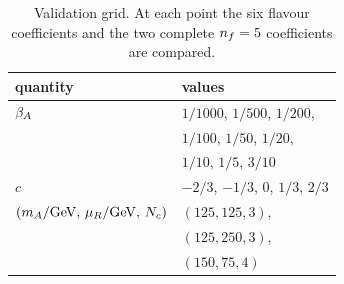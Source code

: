 \begin{table}[t]
\centering


\begin{tabular}{ll}
\toprule
quantity & values \\
\midrule
$\beta_A$ & $1/1000$, $1/500$, $1/200$, \\
 & $1/100$, $1/50$, $1/20$, \\
 & $1/10$, $1/5$, $3/10$ \\
$c$ & $-2/3$, $-1/3$, $0$, $1/3$, $2/3$ \\
$(m_A/\mathrm{GeV},\,\mu_R/\mathrm{GeV},\,N_c)$ & $(125,125,3)$, \\
 & $(125,250,3)$, \\
 & $(150,75,4)$ \\
\bottomrule
\end{tabular}
\caption{Validation grid. At each point the six flavour coefficients and the two complete $n_f=5$ coefficients are compared.}
\label{tab:validation-grid}
\end{table}
